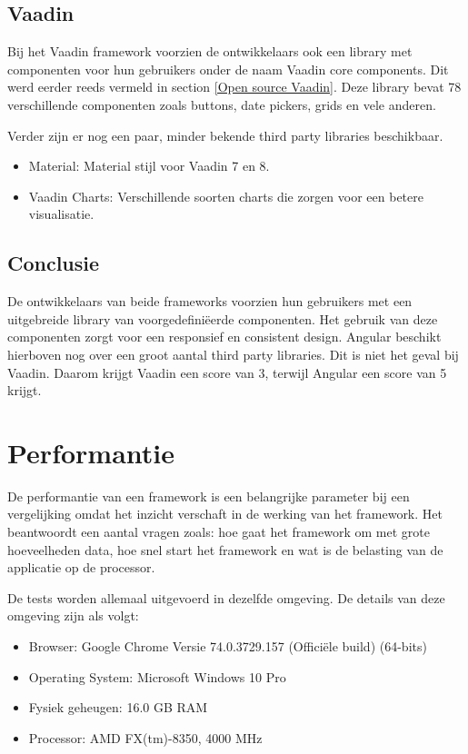 \subsection{Vaadin}
Bij het Vaadin framework voorzien de ontwikkelaars ook een library met componenten voor hun gebruikers onder de naam Vaadin core components. Dit werd eerder reeds vermeld in section \ref{Open source Vaadin}. Deze library bevat 78 verschillende componenten zoals buttons, date pickers, grids en vele anderen. 

Verder zijn er nog een paar, minder bekende third party libraries beschikbaar.
\begin{itemize}
	\item Material: Material stijl voor Vaadin 7 en 8.
	\item Vaadin Charts: Verschillende soorten charts die zorgen voor een betere visualisatie. 
\end{itemize}

\subsection{Conclusie}
De ontwikkelaars van beide frameworks voorzien hun gebruikers met een uitgebreide library van voorgedefiniëerde componenten. Het gebruik van deze componenten zorgt voor een responsief en consistent design. Angular beschikt hierboven nog over een groot aantal third party libraries. Dit is niet het geval bij Vaadin.
Daarom krijgt Vaadin een score van 3, terwijl Angular een score van 5 krijgt.

\section{Performantie}
De performantie van een framework is een belangrijke parameter bij een vergelijking omdat het inzicht verschaft in de werking van het framework. Het beantwoordt een aantal vragen zoals: hoe gaat het framework om met grote hoeveelheden data, hoe snel start het framework en wat is de belasting van de applicatie op de processor.

De tests worden allemaal uitgevoerd in dezelfde omgeving. De details van deze omgeving zijn als volgt:

\begin{itemize}
	
	\item Browser: Google Chrome Versie 74.0.3729.157 (Officiële build) (64-bits)
	\item Operating System: Microsoft Windows 10 Pro
	\item Fysiek geheugen: 16.0 GB RAM
	\item Processor: AMD FX(tm)-8350, 4000 MHz
\end{itemize}

